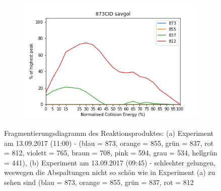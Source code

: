 \begin{figure}[!htbp]
\begin{subfigure}[b]{0.5\textwidth}
    \includegraphics[width=\textwidth, height=\textwidth]{figures/Kapitel4/Kataboliten/diags/873CID-savgol2.png}
    \caption{}
    \label{fig:873MKstructurediags2}
  \end{subfigure}
  
  \caption[Fragmentierungsdiagramm des Reaktionsproduktes von Bo-NCC-1, Quelle: Autor]{Fragmentierungsdiagramm des Reaktionsproduktes: (a) Experiment am 13.09.2017 (11:00) - (blau = 873, orange = 855, grün = 837, rot = 812, violett = 765, braun = 708, pink = 594, grau = 534, hellgrün = 441), (b) Experiment am 13.09.2017 (09:45) - schlechter gelungen, weswegen die Abspaltungen nicht so schön wie in Experiment (a) zu sehen sind (blau = 873, orange = 855, grün = 837, rot = 812}
\end{figure}